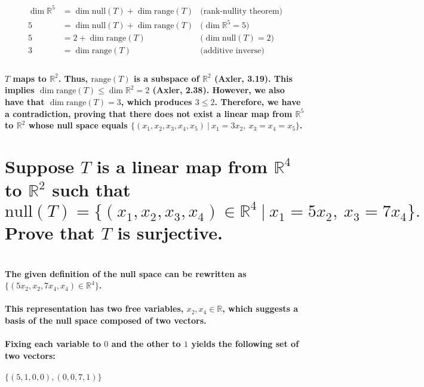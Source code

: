 \documentclass{article}
\begin{document}
\begin{align*}
    \dim \mathbb{R}^5 &= \dim \mathrm{null}(T) + \dim \mathrm{range}(T) & \text{(rank-nullity theorem)}\\
    5 &= \dim \mathrm{null}(T) + \dim \mathrm{range}(T) & \text{($\dim \mathbb{R}^5 = 5$)}\\
    5 &= 2 + \dim \mathrm{range}(T) & \text{($\dim \mathrm{null}(T) = 2$)}\\
    3 &= \dim \mathrm{range}(T) & \text{(additive inverse)}\\
\end{align*}

\paragraph{\large
$T$ maps to $\mathbb{R}^2$. Thus, $\mathrm{range}(T)$ is a subspace of $\mathbb{R}^2$ (Axler, 3.19). This implies $\dim \mathrm{range}(T) \leq \dim \mathbb{R}^2 = 2$ (Axler, 2.38). However, we also have that $\dim \mathrm{range}(T) = 3$, which produces $3 \leq 2$. Therefore, we have a contradiction, proving that there does not exist a linear map from $\mathbb{R}^5$ to $\mathbb{R}^2$ whose null space equals $\{(x_1,x_2,x_3,x_4,x_5)\ |\ x_1 = 3 x_2,\ x_3 = x_4 = x_5\}$.}

\newpage

\section{Suppose $T$ is a linear map from $\mathbb{R}^4$ to $\mathbb{R}^2$ such that 
$$
\mathrm{null}(T) = \{(x_1,x_2,x_3,x_4) \in \mathbb{R}^4 \ |\ x_1 = 5x_2,\ x_3 = 7x_4\}.
$$
Prove that $T$ is surjective.}

\paragraph{\large
\\The given definition of the null space can be rewritten as
\\$\{(5x_2,x_2,7x_4,x_4) \in \mathbb{R}^4\}$.
\\
\\This representation has two free variables, $x_2, x_4 \in \mathbb{R}$, which suggests a basis of the null space composed of two vectors.
\\
\\ Fixing each variable to $0$ and the other to $1$ yields the following set of two vectors:
\\
\\$\{(5, 1, 0, 0), (0, 0, 7, 1)\}$}
\end{document}
